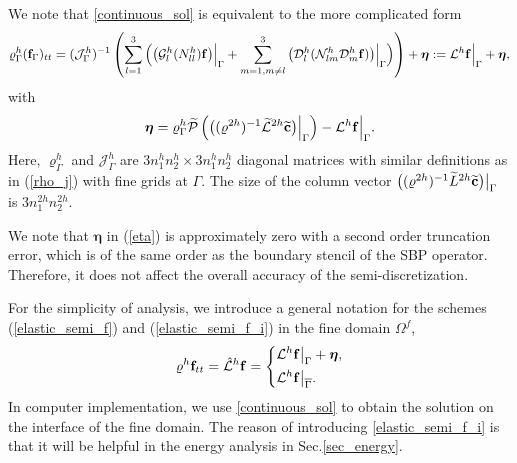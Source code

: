 We note that \eqref{continuous_sol} is equivalent to the more complicated form
\begin{equation}\label{elastic_semi_f_i}
{\varrho}^h_\Gamma ({\bf f}_\Gamma)_{tt} =
( {\mathcal{ J}}^{h}_\Gamma)^{-1}\left(\sum_{l=1}^3\Big(\big(\mathcal{G}_l^{h}({N}_{ll}^h){\bf f}\big)\Big|_\Gamma+\sum_{m=1,m\neq l}^3\big(\mathcal{D}_l^{h}(\mathcal{N}_{lm}^{h}\mathcal{D}_m^{h}{\bf f})\big)\Big|_\Gamma\Big) \right) + {\bm \eta} := \mathcal{L}^h{\bf f}\Big|_\Gamma + {\bm \eta},
\end{equation}
with 
\begin{equation}\label{eta}
{\bm \eta} = {\varrho}^h_{\Gamma}\wt{\mathcal{P}}\left(\big(({ \varrho}^{2h})^{-1}\wt{\mathcal{L}}^{2h} \wt{{\bf c}}\big)\Big|_{\Gamma}\right) - \mathcal{L}^{h}{\bf f}\Big|_{\Gamma}.
\end{equation}
Here, ${\varrho}^{h}_{\Gamma}$ and ${\mathcal{ J}}^{h}_{\Gamma}$ are $3n_1^hn_2^h\times 3n_1^hn_2^h$ diagonal matrices with similar definitions as in (\ref{rho_j}) with fine grids at $\Gamma$. The size of the column vector $\big(({\varrho}^{2h})^{-1}\widetilde{L}^{2h} \widetilde{{\bf c}}\big)\big|_{\Gamma}$ is $3n_1^{2h} n_2^{2h}$. 

 We note that $\bm \eta$ in (\ref{eta}) is approximately zero with a second order truncation error, which is of the same order as the boundary stencil of the SBP operator. Therefore, it does not affect the overall accuracy of the semi-discretization. 

For the simplicity of analysis, we introduce a general notation for the schemes (\ref{elastic_semi_f}) and (\ref{elastic_semi_f_i}) in the fine domain $\Omega^f$,
\begin{align}\label{fine_scheme}
{\varrho}^h{\bf f}_{tt} = \hat{\mathcal{L}}^h{\bf f} = \left\{
\begin{aligned}
&\mathcal{L}^h{\bf f}\big|_\Gamma +{\bm \eta}, \\
&\mathcal{L}^h{\bf f}\big|_{\overline{\Gamma}}.
\end{aligned}
\right.
\end{align}
In computer implementation, we use \eqref{continuous_sol} to obtain the solution on the interface of the fine domain. The reason of introducing    \eqref{elastic_semi_f_i} is that it will be helpful in the energy analysis in Sec.\ref{sec_energy}.


